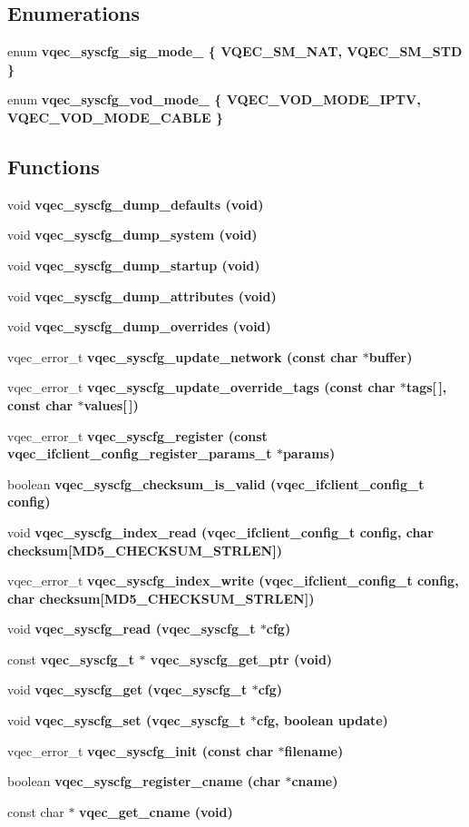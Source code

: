 \subsection*{Enumerations}
\begin{CompactItemize}
\item 
enum \bf{vqec\_\-syscfg\_\-sig\_\-mode\_\-} \{ \bf{VQEC\_\-SM\_\-NAT}, 
\bf{VQEC\_\-SM\_\-STD}
 \}
\item 
enum \bf{vqec\_\-syscfg\_\-vod\_\-mode\_\-} \{ \bf{VQEC\_\-VOD\_\-MODE\_\-IPTV}, 
\bf{VQEC\_\-VOD\_\-MODE\_\-CABLE}
 \}
\end{CompactItemize}
\subsection*{Functions}
\begin{CompactItemize}
\item 
void \bf{vqec\_\-syscfg\_\-dump\_\-defaults} (void)
\item 
void \bf{vqec\_\-syscfg\_\-dump\_\-system} (void)
\item 
void \bf{vqec\_\-syscfg\_\-dump\_\-startup} (void)
\item 
void \bf{vqec\_\-syscfg\_\-dump\_\-attributes} (void)
\item 
void \bf{vqec\_\-syscfg\_\-dump\_\-overrides} (void)
\item 
vqec\_\-error\_\-t \bf{vqec\_\-syscfg\_\-update\_\-network} (const char $\ast$buffer)
\item 
vqec\_\-error\_\-t \bf{vqec\_\-syscfg\_\-update\_\-override\_\-tags} (const char $\ast$tags[$\,$], const char $\ast$values[$\,$])
\item 
vqec\_\-error\_\-t \bf{vqec\_\-syscfg\_\-register} (const \bf{vqec\_\-ifclient\_\-config\_\-register\_\-params\_\-t} $\ast$params)
\item 
boolean \bf{vqec\_\-syscfg\_\-checksum\_\-is\_\-valid} (\bf{vqec\_\-ifclient\_\-config\_\-t} config)
\item 
void \bf{vqec\_\-syscfg\_\-index\_\-read} (\bf{vqec\_\-ifclient\_\-config\_\-t} config, char checksum[MD5\_\-CHECKSUM\_\-STRLEN])
\item 
vqec\_\-error\_\-t \bf{vqec\_\-syscfg\_\-index\_\-write} (\bf{vqec\_\-ifclient\_\-config\_\-t} config, char checksum[MD5\_\-CHECKSUM\_\-STRLEN])
\item 
void \bf{vqec\_\-syscfg\_\-read} (\bf{vqec\_\-syscfg\_\-t} $\ast$cfg)
\item 
const \bf{vqec\_\-syscfg\_\-t} $\ast$ \bf{vqec\_\-syscfg\_\-get\_\-ptr} (void)
\item 
void \bf{vqec\_\-syscfg\_\-get} (\bf{vqec\_\-syscfg\_\-t} $\ast$cfg)
\item 
void \bf{vqec\_\-syscfg\_\-set} (\bf{vqec\_\-syscfg\_\-t} $\ast$cfg, boolean update)
\item 
vqec\_\-error\_\-t \bf{vqec\_\-syscfg\_\-init} (const char $\ast$\bf{filename})
\item 
boolean \bf{vqec\_\-syscfg\_\-register\_\-cname} (char $\ast$cname)
\item 
const char $\ast$ \bf{vqec\_\-get\_\-cname} (void)
\end{CompactItemize}



